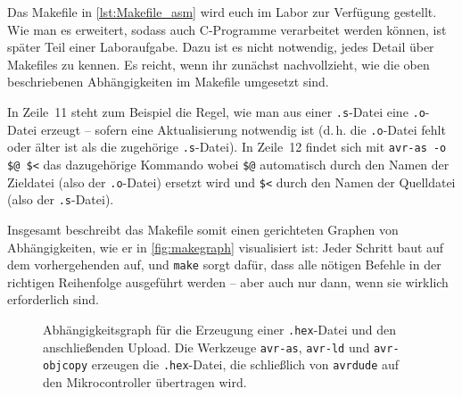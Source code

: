 \documentclass[a4paper,12pt]{article}
\begin{document}
Das Makefile in \autoref{lst:Makefile_asm} wird euch im Labor zur Verfügung
gestellt.  Wie man es erweitert, sodass auch C-Programme verarbeitet werden
können, ist später Teil einer Laboraufgabe.
Dazu ist es nicht notwendig, jedes Detail über Makefiles zu kennen.  Es reicht,
wenn ihr zunächst nachvollzieht, wie die oben beschriebenen Abhängigkeiten im
Makefile umgesetzt sind.

In Zeile~11 steht zum Beispiel die Regel, wie man aus einer \texttt{.s}-Datei
eine \texttt{.o}-Datei erzeugt –  sofern eine Aktualisierung notwendig ist
(d.\,h. die \texttt{.o}-Datei fehlt oder älter ist als die zugehörige
\texttt{.s}-Datei).  
In Zeile~12 findet sich mit
\texttt{avr-as -o \$@ \$<} 
das dazugehörige Kommando
wobei \texttt{\$@} automatisch durch den Namen der Zieldatei (also der
\texttt{.o}-Datei) ersetzt wird  und \texttt{\$<} durch den Namen der
Quelldatei (also der \texttt{.s}-Datei).


Insgesamt beschreibt das Makefile somit einen gerichteten Graphen von
Abhängigkeiten, wie er in \autoref{fig:makegraph} visualisiert ist: Jeder
Schritt baut auf dem vorhergehenden auf, und \texttt{make} sorgt dafür, dass
alle nötigen Befehle in der richtigen Reihenfolge ausgeführt werden – aber auch
nur dann, wenn sie wirklich erforderlich sind.


\begin{figure}[ht]
\centering
{}
\caption{
    Abhängigkeitsgraph für die Erzeugung einer \texttt{.hex}-Datei und den
    anschließenden Upload. Die Werkzeuge \texttt{avr-as}, \texttt{avr-ld} und
    \texttt{avr-objcopy} erzeugen die \texttt{.hex}-Datei, die schließlich von
    \texttt{avrdude} auf den Mikrocontroller übertragen wird.
}
\label{fig:makegraph}
\end{figure}
\end{document}
